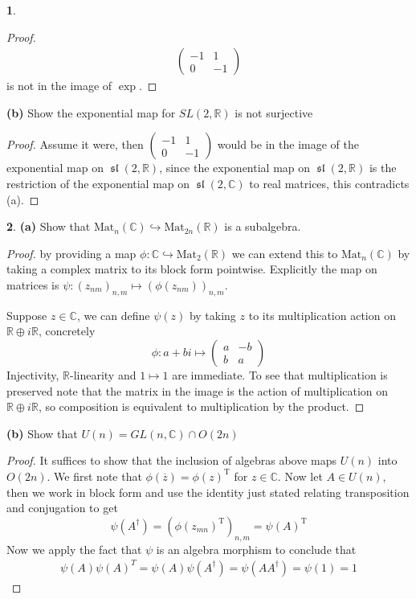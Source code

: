 \documentclass[10.5pt]{article}
\theoremstyle{definition}
\newtheorem{pb}{}
\newcommand{\spl}{\operatorname{\mathfrak{sl}}}
\begin{document}
\begin{pb}
\begin{proof}
\begin{align*}
                \begin{pmatrix} -1 & 1 \\ 0 & -1 \end{pmatrix}
            \end{align*}
            is not in the image of \(\exp\).
         \end{proof}
            \textbf{(b)} Show the exponential map for \(SL(2,\mathbb{R})\) is not surjective
            \begin{proof}
                Assume it were, then \(\begin{pmatrix} -1 & 1 \\ 0 & -1 \end{pmatrix}\) would be in the image of the exponential map on \(\spl(2,\mathbb{R})\), since the exponential map on \(\spl(2,\mathbb{R})\) is the restriction of the exponential map on \(\spl(2,\mathbb{C})\) to real matrices, this contradicts (a).
            \end{proof}
    \end{pb}
    \begin{pb}
        \textbf{(a)} Show that \(\text{Mat}_n(\mathbb{C}) \hookrightarrow \text{Mat}_{2n}(\mathbb{R})\) is a subalgebra.
        \begin{proof}
            by providing a map \(\phi: \mathbb{C} \hookrightarrow \text{Mat}_2(\mathbb{R})\) we can extend this to \(\text{Mat}_n(\mathbb{C})\) by taking a complex matrix to its block form pointwise. Explicitly the map on matrices is \(\psi: (z_{nm})_{n,m} \mapsto (\phi(z_{nm}))_{n,m}\).

            Suppose \(z \in \mathbb{C}\), we can define \(\psi(z)\) by taking \(z\) to its multiplication action on \(\mathbb{R} \oplus i \mathbb{R}\), concretely 
            \[\phi: a + bi \mapsto \begin{pmatrix} a & -b \\ b & a \end{pmatrix}\]
            Injectivity, \(\mathbb{R}\)-linearity and \(1 \mapsto 1\) are immediate. To see that multiplication is preserved note that the matrix in the image is the action of multiplication on \(\mathbb{R} \oplus i \mathbb{R}\), so composition is equivalent to multiplication by the product.
        \end{proof}

        \textbf{(b)} Show that \(U(n) = GL(n,\mathbb{C}) \cap O(2n)\)
        \begin{proof}
            It suffices to show that the inclusion of algebras above maps \(U(n)\) into \(O(2n)\). We first note that \(\phi(\overline{z}) = \phi(z)^\text{T}\) for \(z \in \mathbb{C}\). Now let \(A \in U(n)\), then we work in block form and use the identity just stated relating transposition and conjugation to get \[\psi(A^\dagger) = (\phi(z_{mn})^\text{T})_{n,m} = \psi(A)^\text{T}\]
            Now we apply the fact that \(\psi\) is an algebra morphism to conclude that
            \begin{align*}
                \psi(A)\psi(A)^T = \psi(A)\psi(A^\dagger) = \psi(AA^\dagger) = \psi(1) = 1
            \end{align*}
        \end{proof}
    \end{pb}
\end{document}

